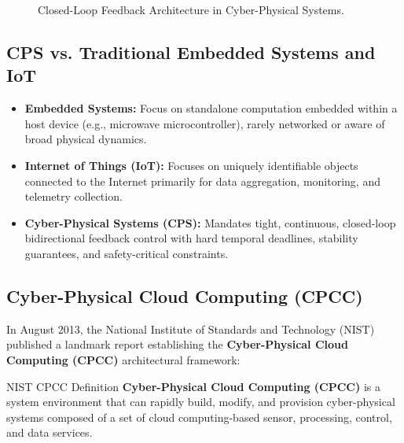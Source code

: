 \documentclass[11pt,a4paper,openany]{report}
\begin{document}
\begin{figure}[H]
\centering
{}
\caption{Closed-Loop Feedback Architecture in Cyber-Physical Systems.}
\end{figure}

\subsection{CPS vs. Traditional Embedded Systems and IoT}
\begin{itemize}[leftmargin=*]
  \item \textbf{Embedded Systems:} Focus on standalone computation embedded within a host device (e.g., microwave microcontroller), rarely networked or aware of broad physical dynamics.
  \item \textbf{Internet of Things (IoT):} Focuses on uniquely identifiable objects connected to the Internet primarily for data aggregation, monitoring, and telemetry collection.
  \item \textbf{Cyber-Physical Systems (CPS):} Mandates tight, continuous, closed-loop bidirectional feedback control with hard temporal deadlines, stability guarantees, and safety-critical constraints.
\end{itemize}

\subsection{Cyber-Physical Cloud Computing (CPCC)}
In August 2013, the National Institute of Standards and Technology (NIST) published a landmark report establishing the \textbf{Cyber-Physical Cloud Computing (CPCC)} architectural framework:
\begin{defbox}{NIST CPCC Definition}
\textbf{Cyber-Physical Cloud Computing (CPCC)} is a system environment that can rapidly build, modify, and provision cyber-physical systems composed of a set of cloud computing-based sensor, processing, control, and data services.
\end{defbox}
\end{document}
